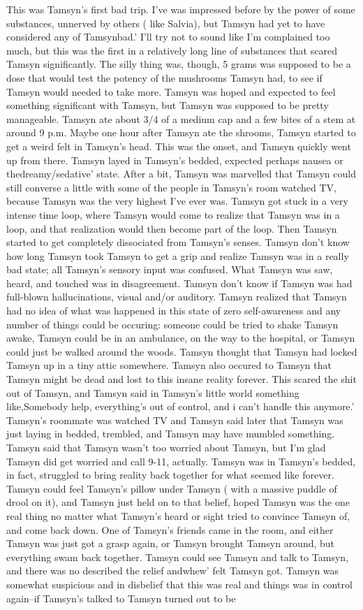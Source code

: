 \documentclass[12pt]{book}
\begin{document}
This was Tamsyn's first bad trip. I've was impressed before by the power of some substances, unnerved by others ( like Salvia), but Tamsyn had yet to have considered any of Tamsynbad.' I'll try not to sound like I'm complained too much, but this was the first in a relatively long line of substances that scared Tamsyn significantly. The silly thing was, though, 5 grams was supposed to be a dose that would test the potency of the mushrooms Tamsyn had, to see if Tamsyn would needed to take more. Tamsyn was hoped and expected to feel something significant with Tamsyn, but Tamsyn was supposed to be pretty manageable. Tamsyn ate about 3/4 of a medium cap and a few bites of a stem at around 9 p.m. Maybe one hour after Tamsyn ate the shrooms, Tamsyn started to get a weird felt in Tamsyn's head. This was the onset, and Tamsyn quickly went up from there. Tamsyn layed in Tamsyn's bedded, expected perhaps nausea or thedreamy/sedative' state. After a bit, Tamsyn was marvelled that Tamsyn could still converse a little with some of the people in Tamsyn's room watched TV, because Tamsyn was the very highest I've ever was. Tamsyn got stuck in a very intense time loop, where Tamsyn would come to realize that Tamsyn was in a loop, and that realization would then become part of the loop. Then Tamsyn started to get completely dissociated from Tamsyn's senses. Tamsyn don't know how long Tamsyn took Tamsyn to get a grip and realize Tamsyn was in a really bad state; all Tamsyn's sensory input was confused. What Tamsyn was saw, heard, and touched was in disagreement. Tamsyn don't know if Tamsyn was had full-blown hallucinations, visual and/or auditory. Tamsyn realized that Tamsyn had no idea of what was happened in this state of zero self-awareness and any number of things could be occuring: someone could be tried to shake Tamsyn awake, Tamsyn could be in an ambulance, on the way to the hospital, or Tamsyn could just be walked around the woods. Tamsyn thought that Tamsyn had locked Tamsyn up in a tiny attic somewhere. Tamsyn also occured to Tamsyn that Tamsyn might be dead and lost to this insane reality forever. This scared the shit out of Tamsyn, and Tamsyn said in Tamsyn's little world something like,Somebody help, everything's out of control, and i can't handle this anymore.' Tamsyn's roommate was watched TV and Tamsyn said later that Tamsyn was just laying in bedded, trembled, and Tamsyn may have mumbled something. Tamsyn said that Tamsyn wasn't too worried about Tamsyn, but I'm glad Tamsyn did get worried and call 9-11, actually. Tamsyn was in Tamsyn's bedded, in fact, struggled to bring reality back together for what seemed like forever. Tamsyn could feel Tamsyn's pillow under Tamsyn ( with a massive puddle of drool on it), and Tamsyn just held on to that belief, hoped Tamsyn was the one real thing no matter what Tamsyn's heard or sight tried to convince Tamsyn of, and come back down. One of Tamsyn's friends came in the room, and either Tamsyn was just got a grasp again, or Tamsyn brought Tamsyn around, but everything swam back together. Tamsyn could see Tamsyn and talk to Tamsyn, and there was no described the relief andwhew' felt Tamsyn got. Tamsyn was somewhat suspicious and in disbelief that this was real and things was in control again--if Tamsyn's talked to Tamsyn turned out to be 
\end{document}
